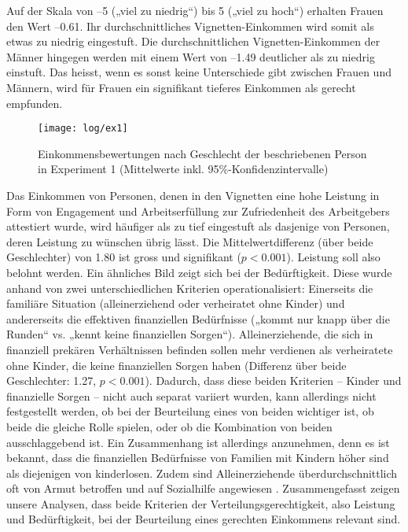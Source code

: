 \documentclass[a4paper,12pt]{article}
\begin{document}

Auf der Skala von --5 („viel zu niedrig“) bis 5 („viel zu hoch“) erhalten
Frauen den Wert --0.61. Ihr durchschnittliches Vignetten-Einkommen wird somit
als etwas zu niedrig eingestuft. Die durchschnittlichen Vignetten-Einkommen der
Männer hingegen werden mit einem Wert von --1.49 deutlicher als zu niedrig
einstuft. Das heisst, wenn es sonst keine Unterschiede gibt zwischen Frauen und
Männern, wird für Frauen ein signifikant tieferes Einkommen als gerecht
empfunden.

\begin{figure}\centering
    \texttt{[image: log/ex1]}
    \caption{Einkommensbewertungen nach Geschlecht der beschriebenen Person 
    in Experiment 1 (Mittelwerte inkl. 95\%-Konfidenzintervalle)}\label{fig-ex1}
\end{figure}


Das Einkommen von Personen, denen in den Vignetten eine hohe Leistung in Form
von Engagement und Arbeitserfüllung zur Zufriedenheit des Arbeitgebers
attestiert wurde, wird häufiger als zu tief eingestuft als dasjenige von
Personen, deren Leistung zu wünschen übrig lässt. Die Mittelwertdifferenz (über
beide Geschlechter) von 1.80 ist gross und signifikant ($p<0.001$). Leistung
soll also belohnt werden. Ein ähnliches Bild zeigt sich bei der Bedürftigkeit.
Diese wurde anhand von zwei unterschiedlichen Kriterien operationalisiert:
Einerseits die familiäre Situation (alleinerziehend oder verheiratet ohne
Kinder) und andererseits die effektiven finanziellen Bedürfnisse („kommt nur
knapp über die Runden“ vs. „kennt keine finanziellen Sorgen“).
Alleinerziehende, die sich in finanziell prekären Verhältnissen befinden sollen
mehr verdienen als verheiratete ohne Kinder, die keine finanziellen Sorgen
haben (Differenz über beide Geschlechter: 1.27, $p<0.001$). Dadurch, dass diese
beiden Kriterien – Kinder und finanzielle Sorgen – nicht auch separat variiert
wurden, kann allerdings nicht festgestellt werden, ob bei der Beurteilung eines
von beiden wichtiger ist, ob beide die gleiche Rolle spielen, oder ob die
Kombination von beiden ausschlaggebend ist. Ein Zusammenhang ist allerdings
anzunehmen, denn es ist bekannt, dass die finanziellen Bedürfnisse von Familien
mit Kindern höher sind als diejenigen von kinderlosen. Zudem sind
Alleinerziehende überdurchschnittlich oft von Armut betroffen und auf
Sozialhilfe angewiesen \citep{Amacker-etal-2015}. Zusammengefasst zeigen unsere
Analysen, dass beide Kriterien der Verteilungsgerechtigkeit, also Leistung und
Bedürftigkeit, bei der Beurteilung eines gerechten Einkommens relevant sind.
\end{document}
